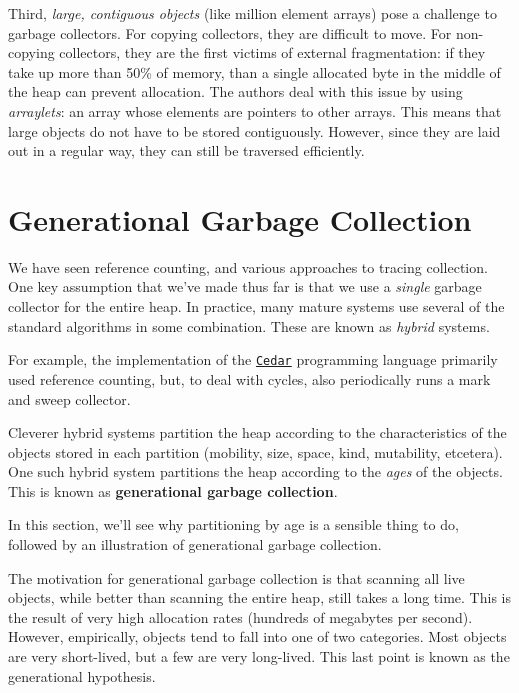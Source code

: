 Third, \textit{large, contiguous objects} (like million element arrays) pose a challenge to garbage collectors. For copying collectors, they are difficult to move. For non-copying collectors, they are the first victims of external fragmentation: if they take up more than 50\% of memory, than a single allocated byte in the middle of the heap can prevent allocation. The authors deal with this issue by using \textit{arraylets}: an array whose elements are pointers to other arrays. This means that large objects do not have to be stored contiguously. However, since they are laid out in a regular way, they can still be traversed efficiently.

\section{Generational Garbage Collection}
We have seen reference counting, and various approaches to tracing collection. One key assumption that we've made thus far is that we use a \textit{single} garbage collector for the entire heap. In practice, many mature systems use several of the standard algorithms in some combination. These are known as \textit{hybrid} systems.

For example, the implementation of the \href{https://www.cedarpolicy.com/en}{\texttt{Cedar}} programming language primarily used reference counting, but, to deal with cycles, also periodically runs a mark and sweep collector. 

Cleverer hybrid systems partition the heap according to the characteristics of the objects stored in each partition (mobility, size, space, kind, mutability, etcetera). One such hybrid system partitions the heap according to the \textit{ages} of the objects. This is known as \textbf{generational garbage collection}.

In this section, we'll see why partitioning by age is a sensible thing to do, followed by an illustration of generational garbage collection. 

The motivation for generational garbage collection is that scanning all live objects, while better than scanning the entire heap, still takes a long time. This is the result of very high allocation rates (hundreds of megabytes per second). However, empirically, objects tend to fall into one of two categories. Most objects are very short-lived, but a few are very long-lived. This last point is known as the generational hypothesis.

